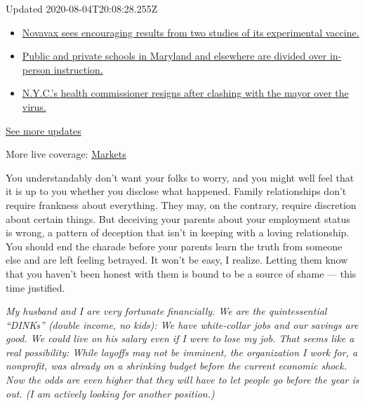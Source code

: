 Updated 2020-08-04T20:08:28.255Z

\begin{itemize}
\tightlist
\item
  \href{https://www.nytimes.com/2020/08/04/world/coronavirus-cases.html?action=click\&pgtype=Article\&state=default\&region=MAIN_CONTENT_1\&context=storylines_live_updates\#link-1228a480}{Novavax
  sees encouraging results from two studies of its experimental
  vaccine.}
\item
  \href{https://www.nytimes.com/2020/08/04/world/coronavirus-cases.html?action=click\&pgtype=Article\&state=default\&region=MAIN_CONTENT_1\&context=storylines_live_updates\#link-4825b93}{Public
  and private schools in Maryland and elsewhere are divided over
  in-person instruction.}
\item
  \href{https://www.nytimes.com/2020/08/04/world/coronavirus-cases.html?action=click\&pgtype=Article\&state=default\&region=MAIN_CONTENT_1\&context=storylines_live_updates\#link-4d1eafa8}{N.Y.C.'s
  health commissioner resigns after clashing with the mayor over the
  virus.}
\end{itemize}

\href{https://www.nytimes.com/2020/08/04/world/coronavirus-cases.html?action=click\&pgtype=Article\&state=default\&region=MAIN_CONTENT_1\&context=storylines_live_updates}{See
more updates}

More live coverage:
\href{https://www.nytimes.com/live/2020/08/04/business/stock-market-today-coronavirus?action=click\&pgtype=Article\&state=default\&region=MAIN_CONTENT_1\&context=storylines_live_updates}{Markets}

You understandably don't want your folks to worry, and you might well
feel that it is up to you whether you disclose what happened. Family
relationships don't require frankness about everything. They may, on the
contrary, require discretion about certain things. But deceiving your
parents about your employment status is wrong, a pattern of deception
that isn't in keeping with a loving relationship. You should end the
charade before your parents learn the truth from someone else and are
left feeling betrayed. It won't be easy, I realize. Letting them know
that you haven't been honest with them is bound to be a source of shame
--- this time justified.

\emph{My husband and I are very fortunate financially. We are the
quintessential ``DINKs'' (double income, no kids): We have white-collar
jobs and our savings are good. We could live on his salary even if I
were to lose my job. That seems like a real possibility: While layoffs
may not be imminent, the organization I work for, a nonprofit, was
already on a shrinking budget before the current economic shock. Now the
odds are even higher that they will have to let people go before the
year is out. (I am actively looking for another position.)}

